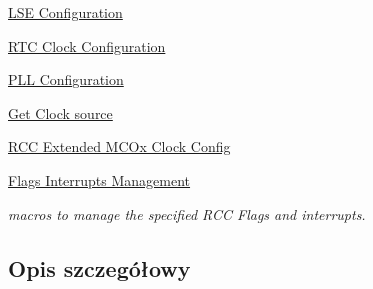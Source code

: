 \begin{DoxyCompactItemize}
\item 
\hyperlink{group___r_c_c___l_s_e___configuration}{L\+S\+E Configuration}
\item 
\hyperlink{group___r_c_c___internal___r_t_c___clock___configuration}{R\+T\+C Clock Configuration}
\item 
\hyperlink{group___r_c_c___p_l_l___configuration}{P\+L\+L Configuration}
\item 
\hyperlink{group___r_c_c___get___clock__source}{Get Clock source}
\item 
\hyperlink{group___r_c_c_ex___m_c_ox___clock___config}{R\+C\+C Extended M\+C\+Ox Clock Config}
\item 
\hyperlink{group___r_c_c___flags___interrupts___management}{Flags Interrupts Management}
\begin{DoxyCompactList}\small\item\em macros to manage the specified R\+CC Flags and interrupts. \end{DoxyCompactList}\end{DoxyCompactItemize}


\subsection{Opis szczegółowy}
